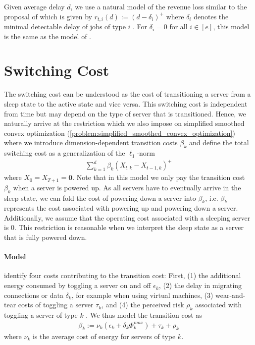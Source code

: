 Given average delay $d$, we use a natural model of the revenue loss similar to the proposal of \citeauthor*{Lin2011} which is given by $r_{t,i}(d) := (d - \delta_i)^+$ where $\delta_i$ denotes the minimal detectable delay of jobs of type $i$ \cite{Lin2011}. For $\delta_i = 0$ for all $i \in [e]$, this model is the same as the model of \cite{Lin2012}.

\section{Switching Cost}

The switching cost can be understood as the cost of transitioning a server from a sleep state to the active state and vice versa. This switching cost is independent from time but may depend on the type of server that is transitioned. Hence, we naturally arrive at the restriction which we also impose on simplified smoothed convex optimization (\autoref{problem:simplified_smoothed_convex_optimization}) where we introduce dimension-dependent transition costs $\beta_k$ and define the total switching cost as a generalization of the $\ell_1$-norm \begin{align*}
    \sum_{k=1}^d \beta_k (X_{t,k} - X_{t-1,k})^+
\end{align*} where $X_0 = X_{T+1} = \mathbf{0}$. Note that in this model we only pay the transition cost $\beta_k$ when a server is powered up. As all servers have to eventually arrive in the sleep state, we can fold the cost of powering down a server into $\beta_k$, i.e. $\beta_k$ represents the cost associated with powering up and powering down a server. Additionally, we assume that the operating cost associated with a sleeping server is $0$. This restriction is reasonable when we interpret the sleep state as a server that is fully powered down.

\paragraph{Model} \citeauthor*{Lin2011} identify four costs contributing to the transition cost: First, (1) the additional energy consumed by toggling a server on and off $\epsilon_k$, (2) the delay in migrating connections or data $\delta_k$, for example when using virtual machines, (3) wear-and-tear costs of toggling a server $\tau_k$, and (4) the perceived risk $\rho_k$ associated with toggling a server of type $k$ \cite{Lin2011}. We thus model the transition cost as \begin{align*}
    \beta_k := \nu_k(\epsilon_k + \delta_k \Phi_k^{max}) + \tau_k + \rho_k
\end{align*} where $\nu_k$ is the average cost of energy for servers of type $k$.

